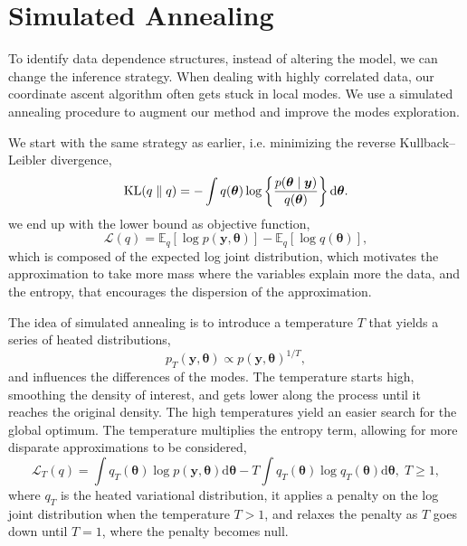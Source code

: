 \documentclass[a4paper, 11pt]{report}
\numberwithin{equation}{chapter}
\DeclareMathOperator*{\KL}{{\rm KL}}
\begin{document}
\section{Simulated Annealing}
To identify data dependence structures, instead of altering the model, we can change the inference strategy. When dealing with highly correlated data, our coordinate ascent algorithm often gets stuck in local modes. We use a simulated annealing procedure to augment our method and improve the modes exploration.

We start with the same strategy as earlier, i.e. minimizing the reverse Kullback--Leibler divergence,
\begin{equation*}
\KL(q \parallel q) = -\int q(\boldsymbol{\theta}) \log\left\lbrace\frac{p(\boldsymbol{\theta}\mid\boldsymbol{y})}{q(\boldsymbol{\theta})}\right\rbrace \mathrm{d}\boldsymbol{\theta}.
\end{equation*}
we end up with the lower bound as objective function,
\begin{equation*}
\mathcal{L}(q) = \mathbb{E}_q\left[ \log p(\boldsymbol{y}, \boldsymbol{\theta})\right] - \mathbb{E}_q\left[\log q(\boldsymbol{\theta})\right],
\end{equation*}
which is composed of the expected log joint distribution, which motivates the approximation to take more mass where the variables explain more the data, and the entropy, that encourages the dispersion of the approximation. 

The idea of simulated annealing is to introduce a temperature $T$ that yields a series of heated distributions,
\begin{equation*}
p_T(\boldsymbol{y},\boldsymbol{\theta}) \propto p(\boldsymbol{y},\boldsymbol{\theta})^{1/T},
\end{equation*}
and influences the differences of the modes. The temperature starts high, smoothing the density of interest, and gets lower along the process until it reaches the original density. The high temperatures yield an easier search for the global optimum. The temperature multiplies the entropy term, allowing for more disparate approximations to be considered,
\begin{equation}
\mathcal{L}_T(q) = \int q_T(\boldsymbol{\theta}) \log p(\boldsymbol{y},\boldsymbol{\theta})\mathrm{d}\boldsymbol{\theta} - T \int q_T(\boldsymbol{\theta}) \log q_T(\boldsymbol{\theta}) \mathrm{d}\boldsymbol{\theta},\; T\geq 1,
\label{eq:ann_elbo}
\end{equation}
where $q_T$ is the heated variational distribution, it applies a penalty on the log joint distribution when the temperature $T > 1$, and relaxes the penalty as $T$ goes down until $T = 1$, where the penalty becomes null.
\end{document}
